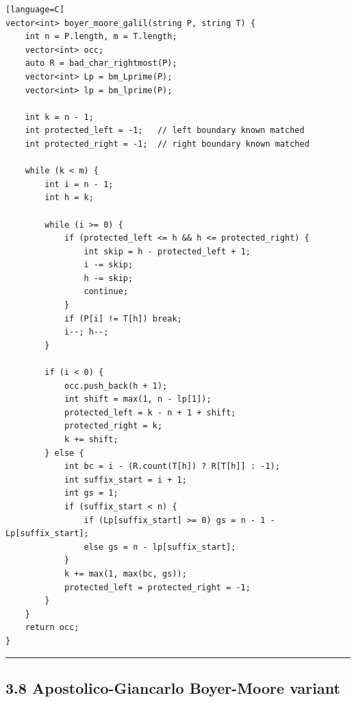 \documentclass[11pt]{article}
\begin{document}
\begin{verbatim}[language=C]
vector<int> boyer_moore_galil(string P, string T) {
    int n = P.length, m = T.length;
    vector<int> occ;
    auto R = bad_char_rightmost(P);
    vector<int> Lp = bm_Lprime(P);
    vector<int> lp = bm_lprime(P);

    int k = n - 1;
    int protected_left = -1;   // left boundary known matched
    int protected_right = -1;  // right boundary known matched

    while (k < m) {
        int i = n - 1;
        int h = k;

        while (i >= 0) {
            if (protected_left <= h && h <= protected_right) {
                int skip = h - protected_left + 1;
                i -= skip;
                h -= skip;
                continue;
            }
            if (P[i] != T[h]) break;
            i--; h--;
        }

        if (i < 0) {
            occ.push_back(h + 1);
            int shift = max(1, n - lp[1]);
            protected_left = k - n + 1 + shift;
            protected_right = k;
            k += shift;
        } else {
            int bc = i - (R.count(T[h]) ? R[T[h]] : -1);
            int suffix_start = i + 1;
            int gs = 1;
            if (suffix_start < n) {
                if (Lp[suffix_start] >= 0) gs = n - 1 - Lp[suffix_start];
                else gs = n - lp[suffix_start];
            }
            k += max(1, max(bc, gs));
            protected_left = protected_right = -1;
        }
    }
    return occ;
}
\end{verbatim}

\begin{center}\rule{0.5\linewidth}{0.5pt}\end{center}

\subsection{3.8 Apostolico-Giancarlo Boyer-Moore variant}\label{apostolico-giancarlo-boyer-moore-variant}
\end{document}
